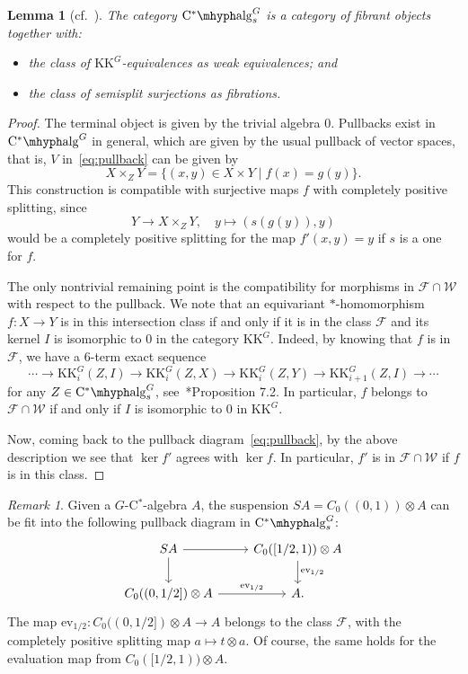 \documentclass[a4paper,reqno]{amsart}
\theoremstyle{plain}
\newtheorem{lemma}[theorem]{Lemma}
\theoremstyle{definition}
\theoremstyle{remark}
\newtheorem{remark}[theorem]{Remark}
\numberwithin{equation}{section}
\newcommand{\cF}{\mathcal{F}}
\newcommand{\cW}{\mathcal{W}}
\newcommand{\CstAlg}{\mathrm{C}^*\mhyph\mathrm{alg}}
\newcommand{\KK}{\mathrm{KK}}
\begin{document}
\begin{lemma}[cf.~]\label{lem:cat-fib-objs}
The category $\CstAlg_s^G$ is a category of fibrant objects together with:
\begin{itemize}
\item the class of $\KK^G$-equivalences as weak equivalences; and
\item the class of semisplit surjections as fibrations.
\end{itemize}
\end{lemma}

\begin{proof}
The terminal object is given by the trivial algebra $0$.
Pullbacks exist in $\CstAlg^G$ in general, which are given by the usual pullback of vector spaces, that is, $V$ in~\eqref{eq:pullback} can be given by
\[
X \times_Z Y = \{ (x, y) \in X \times Y \mid f(x) = g(y) \}.
\]
This construction is compatible with surjective maps $f$ with completely positive splitting, since
\[
Y \to X \times_Z Y, \quad
y \mapsto (s(g(y)), y)
\]
would be a completely positive splitting for the map $f'(x, y) = y$ if $s$ is a one for $f$.

The only nontrivial remaining point is the compatibility for morphisms in $\cF \cap \cW$ with respect to the pullback.
We note that an equivariant $*$-homomorphism $f \colon X \to Y$ is in this intersection class if and only if it is in the class $\cF$ and its kernel $I$ is isomorphic to $0$ in the category $\KK^G$.
Indeed, by knowing that $f$ is in $\cF$, we have a $6$-term exact sequence
\[
\cdots \to \KK^G_i(Z, I) \to \KK^G_i(Z, X) \to \KK^G_i(Z, Y) \to \KK^G_{i + 1}(Z, I) \to \cdots
\]
for any $Z \in \CstAlg_s^G$, see~\cite{tu:hyp}*{Proposition 7.2}.
In particular, $f$ belongs to $\cF \cap \cW$ if and only if $I$ is isomorphic to $0$ in $\KK^G$.

Now, coming back to the pullback diagram~\eqref{eq:pullback}, by the above description we see that $\ker f'$ agrees with $\ker f$.
In particular, $f'$ is in $\cF \cap \cW$ if $f$ is in this class.
\end{proof}

\begin{remark}\label{rem:suspension-as-pullback}
Given a $G$-C$^*$-algebra $A$, the suspension $S A = C_0((0, 1)) \otimes A$ can be fit into the following pullback diagram in $\CstAlg_s^G$:
\[
\begin{tikzcd}
S A \arrow[r] \arrow[d] & C_0([1/2, 1)) \otimes A \arrow[d, "\mathrm{ev}_{1/2}"] \\
C_0((0, 1/2]) \otimes A \arrow[r, "\mathrm{ev}_{1/2}"] & A.
\end{tikzcd}
\]
The map $\mathrm{ev}_{1/2}\colon C_0((0, 1/2]) \otimes A \to A$ belongs to the class $\cF$, with the completely positive splitting map $a \mapsto t \otimes a$.
Of course, the same holds for the evaluation map from $C_0([1/2, 1)) \otimes A$.
\end{remark}
\end{document}
